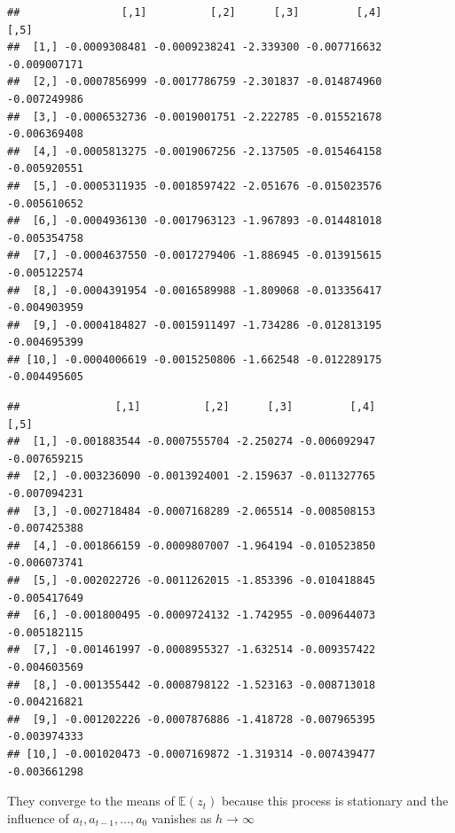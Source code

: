 \documentclass[12pt,a4paper]{article}
\newenvironment{Shaded}{\begin{snugshade}}{\end{snugshade}}
\newcommand{\CommentTok}[1]{\textcolor[rgb]{0.56,0.35,0.01}{\textit{#1}}}
\newcommand{\DataTypeTok}[1]{\textcolor[rgb]{0.13,0.29,0.53}{#1}}
\newcommand{\DecValTok}[1]{\textcolor[rgb]{0.00,0.00,0.81}{#1}}
\newcommand{\FloatTok}[1]{\textcolor[rgb]{0.00,0.00,0.81}{#1}}
\newcommand{\KeywordTok}[1]{\textcolor[rgb]{0.13,0.29,0.53}{\textbf{#1}}}
\newcommand{\NormalTok}[1]{#1}
\newcommand{\OperatorTok}[1]{\textcolor[rgb]{0.81,0.36,0.00}{\textbf{#1}}}
\newcommand{\OtherTok}[1]{\textcolor[rgb]{0.56,0.35,0.01}{#1}}
\newcommand{\StringTok}[1]{\textcolor[rgb]{0.31,0.60,0.02}{#1}}
\begin{document}
\begin{Shaded}
\end{Shaded}

\begin{verbatim}
##                [,1]          [,2]      [,3]         [,4]         [,5]
##  [1,] -0.0009308481 -0.0009238241 -2.339300 -0.007716632 -0.009007171
##  [2,] -0.0007856999 -0.0017786759 -2.301837 -0.014874960 -0.007249986
##  [3,] -0.0006532736 -0.0019001751 -2.222785 -0.015521678 -0.006369408
##  [4,] -0.0005813275 -0.0019067256 -2.137505 -0.015464158 -0.005920551
##  [5,] -0.0005311935 -0.0018597422 -2.051676 -0.015023576 -0.005610652
##  [6,] -0.0004936130 -0.0017963123 -1.967893 -0.014481018 -0.005354758
##  [7,] -0.0004637550 -0.0017279406 -1.886945 -0.013915615 -0.005122574
##  [8,] -0.0004391954 -0.0016589988 -1.809068 -0.013356417 -0.004903959
##  [9,] -0.0004184827 -0.0015911497 -1.734286 -0.012813195 -0.004695399
## [10,] -0.0004006619 -0.0015250806 -1.662548 -0.012289175 -0.004495605
\end{verbatim}

\begin{Shaded}
\end{Shaded}

\begin{verbatim}
##               [,1]          [,2]      [,3]         [,4]         [,5]
##  [1,] -0.001883544 -0.0007555704 -2.250274 -0.006092947 -0.007659215
##  [2,] -0.003236090 -0.0013924001 -2.159637 -0.011327765 -0.007094231
##  [3,] -0.002718484 -0.0007168289 -2.065514 -0.008508153 -0.007425388
##  [4,] -0.001866159 -0.0009807007 -1.964194 -0.010523850 -0.006073741
##  [5,] -0.002022726 -0.0011262015 -1.853396 -0.010418845 -0.005417649
##  [6,] -0.001800495 -0.0009724132 -1.742955 -0.009644073 -0.005182115
##  [7,] -0.001461997 -0.0008955327 -1.632514 -0.009357422 -0.004603569
##  [8,] -0.001355442 -0.0008798122 -1.523163 -0.008713018 -0.004216821
##  [9,] -0.001202226 -0.0007876886 -1.418728 -0.007965395 -0.003974333
## [10,] -0.001020473 -0.0007169872 -1.319314 -0.007439477 -0.003661298
\end{verbatim}

They converge to the means of \(\mathbb{E}(z_t)\) because this process
is stationary and the influence of \(a_t, a_{t-1}, \ldots, a_{0}\)
vanishes as \(h \rightarrow \infty\)
\end{document}
